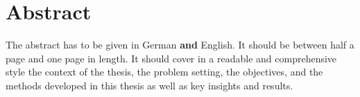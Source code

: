 
\chapter*{Abstract}
The abstract has to be given in German \textbf{and} English. It should
be between half a page and one page in length. It should cover in a
readable and comprehensive style the context of the thesis, the
problem setting, the objectives, and the methods developed in this
thesis as well as key insights and results.
